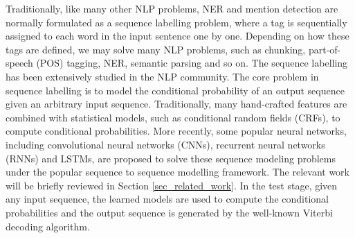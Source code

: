 \documentclass[11pt,a4paper]{article}
\begin{document}
Traditionally, like many other NLP problems, NER and mention detection are normally formulated as a sequence labelling problem, where a tag is sequentially assigned to each word in the input sentence one by one. Depending on how these tags are defined, we may solve many NLP problems, such as chunking, part-of-speech (POS) tagging, NER, semantic parsing and so on. The sequence labelling has been extensively studied in the NLP community. The core problem in sequence labelling is to model the conditional probability of an output sequence given an arbitrary input sequence. Traditionally, many hand-crafted features are combined with statistical models, such as conditional random fields (CRFs), to compute conditional probabilities. More recently, some popular neural networks, including convolutional neural networks (CNNs), recurrent neural networks (RNNs) and LSTMs, are proposed to solve these sequence modeling problems under the popular sequence to sequence modelling framework. The relevant work will be briefly reviewed in Section \ref{sec_related_work}. 
In the test stage, given any input sequence, the learned models are used to compute the conditional probabilities and the output sequence is generated by the well-known Viterbi decoding algorithm. 
\end{document}
